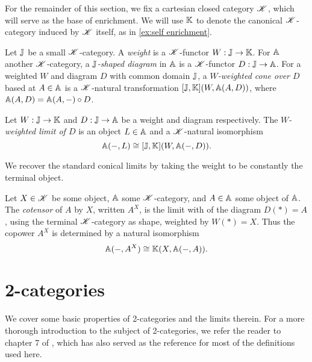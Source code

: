 \documentclass[../thesis.tex]{subfiles}
\begin{document}
For the remainder of this section, we fix a cartesian closed category ${\mathscr{K}}$, which will serve as the base of enrichment.
We will use ${\mathbb{K}}$ to denote the canonical ${\mathscr{K}}$-category induced by ${\mathscr{K}}$ itself, as in \cref{ex:self enrichment}.

\begin{definition}
  Let ${\mathbb{J}}$ be a small ${\mathscr{K}}$-category. A \emph{weight} is a ${\mathscr{K}}$-functor $W : {\mathbb{J}} \to {\mathbb{K}}$. For ${\mathbb{A}}$ another ${\mathscr{K}}$-category,
  a \emph{${\mathbb{J}}$-shaped diagram} in ${\mathbb{A}}$ is a ${\mathscr{K}}$-functor $D : {\mathbb{J}} \to {\mathbb{A}}$. For a weighted $W$ and diagram $D$ with common
  domain ${\mathbb{J}}$, a \emph{$W$-weighted cone over $D$} based at $A \in {\mathbb{A}}$ is a ${\mathscr{K}}$-natural transformation $[{\mathbb{J}}, {\mathbb{K}}](W,
  {\mathbb{A}}(A,D))$, where ${\mathbb{A}}(A,D) = {\mathbb{A}}(A,-) \circ D$.
\end{definition}

\begin{definition}\label{def:weighted limit}
  Let $W : {\mathbb{J}} \to {\mathbb{K}}$ and $D : {\mathbb{J}} \to {\mathbb{A}}$ be a weight and diagram respectively. The \emph{$W$-weighted limit of $D$} is
  an object $L \in {\mathbb{A}}$ and a ${\mathscr{K}}$-natural isomorphism
  \[{\mathbb{A}}(-,L) \cong [{\mathbb{J}},{\mathbb{K}}](W,{\mathbb{A}}(-,D)).\]
\end{definition}

\begin{example}
  We recover the standard conical limits by taking the weight to be constantly the terminal object.
\end{example}

\begin{example}[Cotensors]
  Let $X \in {\mathscr{K}}$ be some object, ${\mathbb{A}}$ some ${\mathscr{K}}$-category, and $A \in {\mathbb{A}}$ some object of ${\mathbb{A}}$. The \emph{cotensor}
  of $A$ by $X$, written $A^X$, is the limit with of the diagram $D(*) = A$, using the terminal ${\mathscr{K}}$-category as shape,
  weighted by $W(*) = X$. Thus the copower $A^X$ is determined by a natural isomorphism
  \[{\mathbb{A}}(-,A^X) \cong {\mathbb{K}}(X,{\mathbb{A}}(-,A)).\]
\end{example}

\section{2-categories}
\label{sec:2-cats}
We cover some basic properties of 2-categories and the limits therein. For a more thorough introduction to the subject of
2-categories, we refer the reader to chapter 7 of \cite{borceux1994a}, which has also served as the reference for most of
the definitions used here.
\end{document}
